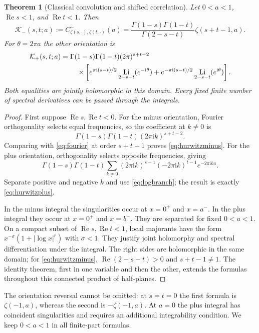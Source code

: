 \documentclass[11pt]{article}
\numberwithin{equation}{section}
\newtheorem{theorem}{Theorem}[section]
\theoremstyle{definition}\newtheorem{definition}[theorem]{Definition}
\theoremstyle{remark}\newtheorem{remark}[theorem]{Remark}
\DeclareMathOperator{\Li}{Li}
\DeclareMathOperator{\Rea}{Re}
\newcommand{\iu}{\mathrm i}
\newcommand{\calK}{\mathcal K}
\begin{document}
\begin{theorem}[Classical convolution and shifted correlation]
\label{thm:classical}
Let $0<a<1$, $\Rea s<1$, and $\Rea t<1$. Then
\begin{equation}\label{eq:hurwitzminus}
 \calK_-(s,t;a):=C^-_{\zeta(s,\cdot),\zeta(t,\cdot)}(a)
 =\frac{\Gamma(1-s)\Gamma(1-t)}{\Gamma(2-s-t)}
                         \zeta(s+t-1,a).
\end{equation}
For $\theta=2\pi a$ the other orientation is
\begin{align}\label{eq:hurwitzplus}
 \calK_+(s,t;a)
 ={}&\Gamma(1-s)\Gamma(1-t)(2\pi)^{s+t-2}\notag\\
 &\quad\times\left[
 e^{\pi\iu(s-t)/2}\Li_{2-s-t}(e^{-\iu\theta})
 +e^{-\pi\iu(s-t)/2}\Li_{2-s-t}(e^{\iu\theta})\right].
\end{align}
Both equalities are jointly holomorphic in this domain. Every fixed finite
number of spectral derivatives can be passed through the integrals.
\end{theorem}
\begin{proof}
First suppose $\Rea s,\Rea t<0$. For the minus orientation, Fourier
orthogonality selects equal frequencies, so the coefficient at $k\ne0$ is
\[
 \Gamma(1-s)\Gamma(1-t)(2\pi\iu k)^{s+t-2}.
\]
Comparing with \eqref{eq:fourier} at order $s+t-1$ proves
\eqref{eq:hurwitzminus}. For the plus orientation, orthogonality selects
opposite frequencies, giving
\[
 \Gamma(1-s)\Gamma(1-t)
 \sum_{k\ne0}(2\pi\iu k)^{s-1}
             (-2\pi\iu k)^{t-1}e^{-2\pi\iu ka}.
\]
Separate positive and negative $k$ and use \eqref{eq:logbranch}; the result
is exactly \eqref{eq:hurwitzplus}.

In the minus integral the singularities occur at $x=0^+$ and $x=a^-$.
In the plus integral they occur at $x=0^+$ and $x=b^+$. They are separated
for fixed $0<a<1$. On a compact subset of $\Rea s,\Rea t<1$, local
majorants have the form $x^{-\sigma}(1+|\log x|^r)$ with $\sigma<1$.
They justify joint holomorphy and spectral differentiation under the
integral. The right sides are holomorphic in the same domain; for
\eqref{eq:hurwitzminus}, $\Rea(2-s-t)>0$ and $s+t-1\ne1$.
The identity theorem, first in one variable and then the other, extends
the formulas throughout this connected product of half-planes.
\end{proof}

The orientation reversal cannot be omitted: at $s=t=0$ the first formula
is $\zeta(-1,a)$, whereas the second is $-\zeta(-1,a)$. At $a=0$ the
plus integral has coincident singularities and requires an additional
integrability condition. We keep $0<a<1$ in all finite-part formulas.
\end{document}
